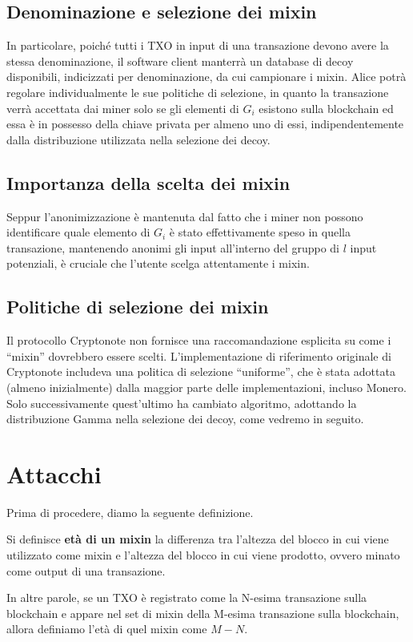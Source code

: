 \subsection{Denominazione e selezione dei mixin}
In particolare, poiché tutti i TXO in input di una transazione devono avere la stessa denominazione, il software client manterrà un database di decoy disponibili, indicizzati per denominazione, da cui campionare i mixin. Alice potrà regolare individualmente le sue politiche di selezione, in quanto la transazione verrà accettata dai miner solo se gli elementi di \(G_i\) esistono sulla blockchain ed essa è in possesso della chiave privata per almeno uno di essi, indipendentemente dalla distribuzione utilizzata nella selezione dei decoy.

\subsection{Importanza della scelta dei mixin}
Seppur l'anonimizzazione è mantenuta dal fatto che i miner non possono identificare quale elemento di \(G_i\) è stato effettivamente speso in quella transazione, mantenendo anonimi gli input all'interno del gruppo di \(l\) input potenziali, è cruciale che l'utente scelga attentamente i mixin.

\subsection{Politiche di selezione dei mixin}
Il protocollo Cryptonote non fornisce una raccomandazione esplicita su come i “mixin” dovrebbero essere scelti. L'implementazione di riferimento originale di Cryptonote includeva una politica di selezione “uniforme”, che è stata adottata (almeno inizialmente) dalla maggior parte delle implementazioni, incluso Monero. Solo successivamente quest'ultimo ha cambiato algoritmo, adottando la distribuzione Gamma nella selezione dei decoy, come vedremo in seguito.

\section{Attacchi}
Prima di procedere, diamo la seguente definizione.

\begin{definition}
Si definisce \textbf{età di un mixin} la differenza tra l'altezza del blocco in cui viene utilizzato come mixin e l'altezza del blocco in cui viene prodotto, ovvero minato come output di una transazione. 
\end{definition}
In altre parole, se un TXO è registrato come la N-esima transazione sulla blockchain e appare nel set di mixin della M-esima transazione sulla blockchain, allora definiamo l'età di quel mixin come \( M - N \).

